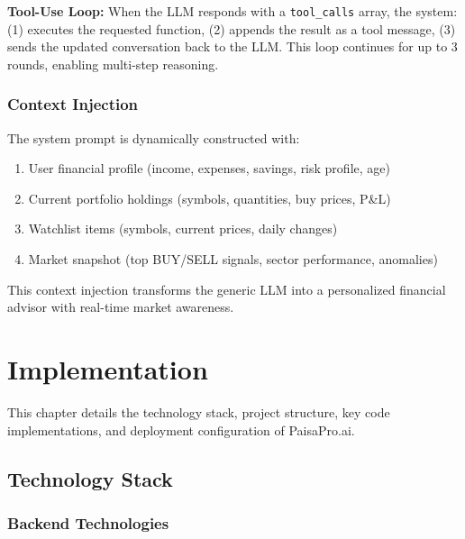 \documentclass[12pt, a4paper, oneside]{report}
\newcommand{\projectname}{PaisaPro.ai}
\begin{document}
\textbf{Tool-Use Loop:} When the LLM responds with a \texttt{tool\_calls} array, the system: (1) executes the requested function, (2) appends the result as a tool message, (3) sends the updated conversation back to the LLM. This loop continues for up to 3 rounds, enabling multi-step reasoning.

\subsection{Context Injection}

The system prompt is dynamically constructed with:
\begin{enumerate}[nosep]
    \item User financial profile (income, expenses, savings, risk profile, age)
    \item Current portfolio holdings (symbols, quantities, buy prices, P\&L)
    \item Watchlist items (symbols, current prices, daily changes)
    \item Market snapshot (top BUY/SELL signals, sector performance, anomalies)
\end{enumerate}

This context injection transforms the generic LLM into a personalized financial advisor with real-time market awareness.


\chapter{Implementation}
\label{chap:implementation}

This chapter details the technology stack, project structure, key code implementations, and deployment configuration of \projectname{}.

\section{Technology Stack}
\label{sec:tech_stack}

\subsection{Backend Technologies}
\end{document}
